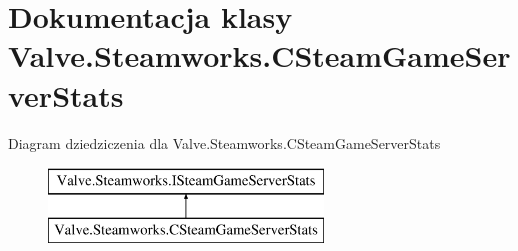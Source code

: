 \hypertarget{class_valve_1_1_steamworks_1_1_c_steam_game_server_stats}{}\section{Dokumentacja klasy Valve.\+Steamworks.\+C\+Steam\+Game\+Server\+Stats}
\label{class_valve_1_1_steamworks_1_1_c_steam_game_server_stats}
Diagram dziedziczenia dla Valve.\+Steamworks.\+C\+Steam\+Game\+Server\+Stats\begin{figure}[H]
\begin{center}
\leavevmode
\includegraphics[height=2.000000cm]{class_valve_1_1_steamworks_1_1_c_steam_game_server_stats}
\end{center}
\end{figure}
